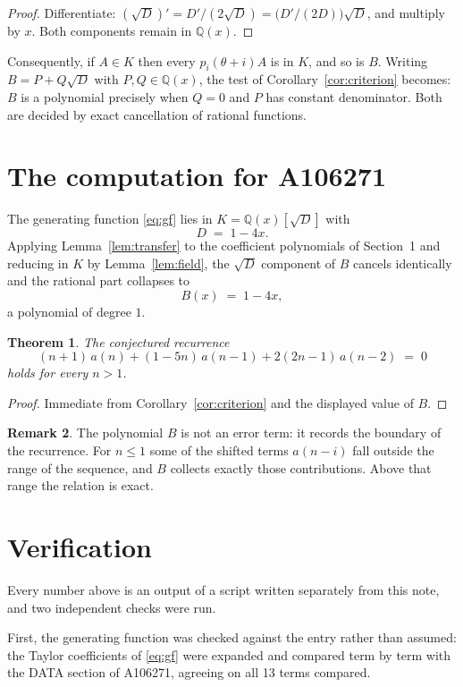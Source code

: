 \documentclass[11pt,a4paper]{article}
\theoremstyle{plain}
\newtheorem{theorem}{Theorem}
\theoremstyle{definition}
\newtheorem{remark}[theorem]{Remark}
\begin{document}
\begin{proof}
Differentiate: $(\sqrt{D})'=D'/(2\sqrt{D})=\bigl(D'/(2D)\bigr)\sqrt{D}$, and multiply by
$x$. Both components remain in $\mathbb{Q}(x)$.
\end{proof}

Consequently, if $A\in K$ then every $p_{i}(\theta+i)A$ is in $K$, and so is $B$. Writing
$B=P+Q\sqrt{D}$ with $P,Q\in\mathbb{Q}(x)$, the test of Corollary~\ref{cor:criterion}
becomes: $B$ is a polynomial precisely when $Q=0$ and $P$ has constant denominator. Both
are decided by exact cancellation of rational functions.

\section{The computation for A106271}

The generating function \eqref{eq:gf} lies in $K=\mathbb{Q}(x)[\sqrt{D}]$ with
\[
D \;=\; 1 - 4 x .
\]
Applying Lemma~\ref{lem:transfer} to the coefficient polynomials of Section~1 and reducing
in $K$ by Lemma~\ref{lem:field}, the $\sqrt{D}$ component of $B$ cancels identically and
the rational part collapses to
\[
B(x)\;=\;1 - 4 x ,
\]
a polynomial of degree $1$.

\begin{theorem}
The conjectured recurrence
\[
(n + 1)\,a(n) + (1 - 5 n)\,a(n-1) + 2 \left(2 n - 1\right)\,a(n-2) \;=\;0
\]
holds for every $n>1$.
\end{theorem}

\begin{proof}
Immediate from Corollary~\ref{cor:criterion} and the displayed value of $B$.
\end{proof}

\begin{remark}
The polynomial $B$ is not an error term: it records the boundary of the recurrence. For
$n\le1$ some of the shifted terms $a(n-i)$ fall outside the range of the sequence,
and $B$ collects exactly those contributions. Above that range the relation is exact.
\end{remark}

\section{Verification}

Every number above is an output of a script written separately from this note, and two
independent checks were run.

First, the generating function was checked against the entry rather than assumed: the
Taylor coefficients of \eqref{eq:gf} were expanded and compared term by term with the DATA
section of A106271, agreeing on all 13 terms compared.
\end{document}
